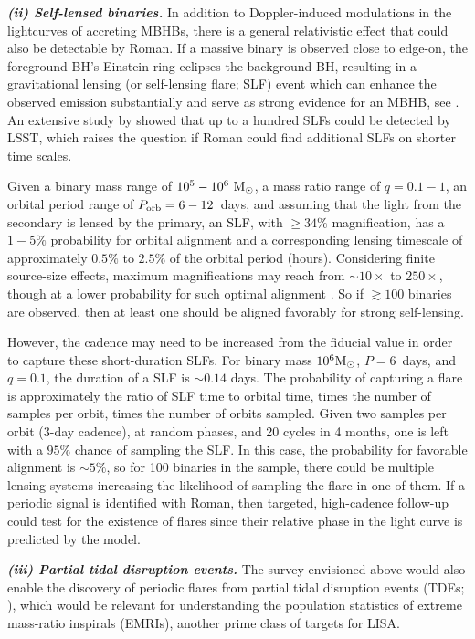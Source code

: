 \documentclass[tightenlines,superscriptaddress,amsmath,amssymb,prl,12pt]{revtex4-1}
\newcommand{\msun}{{\rm M}_\odot}
\begin{document}
\textbf{\it (ii) Self-lensed binaries.}  In addition to
Doppler-induced modulations in the lightcurves of accreting MBHBs,
there is a general relativistic effect that could also be detectable
by Roman. If a massive binary is observed close to edge-on, the
foreground BH's Einstein ring eclipses the background BH, resulting in
a gravitational lensing (or self-lensing flare; SLF) event which can
enhance the observed emission substantially and serve as strong
evidence for an MBHB, see \cite{DOrazioDiStefano2018, HuDOrazio2020,
  Ingram2021, DavelaarHaiman2022}. An extensive study by
\cite{Kelley2021} showed that up to a hundred SLFs could be detected
by LSST, which raises the question if Roman could find additional SLFs
on shorter time scales.

Given a binary mass range of $10^5-10^6~\msun$, a mass ratio range of
$q=0.1-1$, an orbital period range of $P_{\rm orb}=6-12$~days, and
assuming that the light from the secondary is lensed by the primary,
an SLF, with $\geq 34\%$ magnification, has a $1-5\%$ probability for
orbital alignment and a corresponding lensing timescale of
approximately $0.5\%$ to $2.5\%$ of the orbital period
(hours). Considering finite source-size effects, maximum
magnifications may reach from $\sim10\times$ to $250\times$, though at
a lower probability for such optimal alignment
\citep{DOrazioDiStefano2020}.  So if $\gtrsim 100$ binaries are
observed, then at least one should be aligned favorably for strong
self-lensing.

However, the cadence may need to be increased from the fiducial value
in order to capture these short-duration SLFs. For binary mass $10^6
\msun$, $P=6$~days, and $q=0.1$, the duration of a SLF is $\sim0.14$
days. The probability of capturing a flare is approximately the ratio
of SLF time to orbital time, times the number of samples per orbit,
times the number of orbits sampled. Given two samples per orbit (3-day
cadence), at random phases, and 20 cycles in 4 months, one is left
with a $95\%$ chance of sampling the SLF. In this case, the
probability for favorable alignment is $\sim5\%$, so for 100 binaries
in the sample, there could be multiple lensing systems increasing the
likelihood of sampling the flare in one of them. If a periodic signal
is identified with Roman, then targeted, high-cadence follow-up could
test for the existence of flares since their relative phase in the
light curve is predicted by the model.

\textbf{\it (iii) Partial tidal disruption events.}
The survey envisioned above would also enable the discovery of
periodic flares from partial tidal disruption events (TDEs;
\cite{Payne2021}), which would be relevant for understanding the
population statistics of extreme mass-ratio inspirals (EMRIs), another
prime class of targets for LISA.
\end{document}
